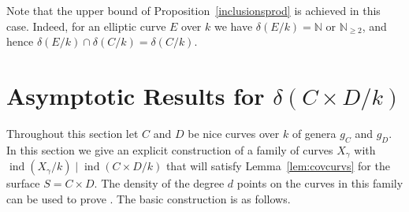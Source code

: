 \documentclass[a4paper,11pt]{amsart}
\theoremstyle{plain}
\theoremstyle{remark}
\newcommand{\nn}{\mathbb{N}}
\newcommand{\dendegs}{\delta}
\newcommand{\ind}{\operatorname{ind}}
\begin{document}
Note that the upper bound of Proposition~\ref{inclusionsprod} is achieved in this case. Indeed, for an elliptic curve $E$ over $k$ we have $\dendegs(E/k)=\nn$ or $\nn_{\geq 2}$, and hence $\dendegs(E/k)\cap\dendegs(C/k)=\dendegs(C/k)$.

\section{Asymptotic Results for $\dendegs(C\times D/k)$} \label{sec: asymptoticresults}
 Throughout this section let \(C\) and \(D\) be nice curves over \(k\) of genera \(g_C\) and \(g_D\).  
In this section we give an explicit construction of a family of curves \(X_\gamma\) with \(\ind(X_\gamma/k) \mid \ind(C \times D/k)\) that will satisfy Lemma~\ref{lem:covcurvs} for the surface \(S = C \times D\).  The density of the degree \(d\) points on the curves in this family can be used to prove .  The basic construction is as follows.
\end{document}
